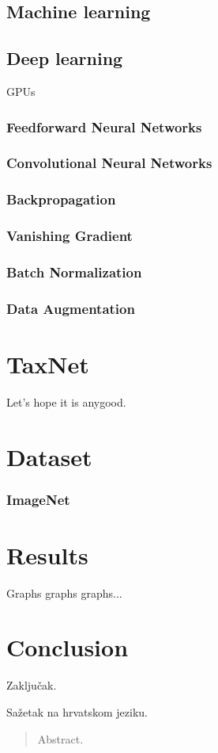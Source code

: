 \documentclass[times, utf8, diplomski]{fer}
\begin{document}
\section{Machine learning}

\section{Deep learning}
GPUs

\subsection{Feedforward Neural Networks}
\subsection{Convolutional Neural Networks}
\subsection{Backpropagation}
\subsection{Vanishing Gradient}
\subsection{Batch Normalization}
\subsection{Data Augmentation}


\chapter{TaxNet}
Let's hope it is anygood.

\chapter{Dataset}
\subsection{ImageNet}

\chapter{Results}
Graphs graphs graphs...

\chapter{Conclusion}
Zaključak.





\begin{sazetak}
Sažetak na hrvatskom jeziku.

\end{sazetak}

\begin{abstract}
Abstract.

\end{abstract}
\end{document}

